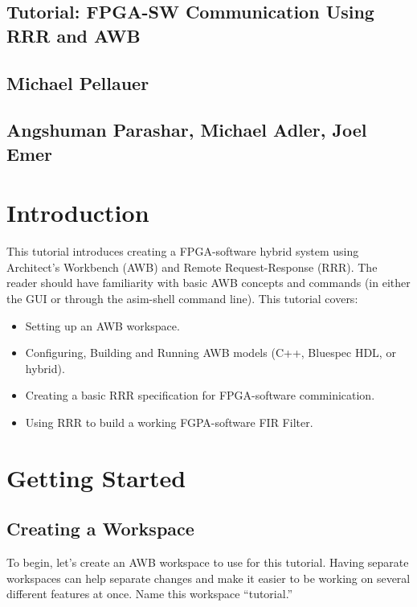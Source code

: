 \documentclass{article}
\begin{document}
\begin{centering}
\section*{Tutorial: FPGA-SW Communication Using RRR and AWB}
\subsection*{Michael Pellauer}
\subsection*{Angshuman Parashar, Michael Adler, Joel Emer}
\end{centering}

\section{Introduction}

This tutorial introduces creating a FPGA-software hybrid system using Architect's Workbench (AWB) and Remote Request-Response (RRR). The reader should have
familiarity with basic AWB concepts and commands (in either the GUI or through the asim-shell command line). This tutorial covers:

\begin{itemize}
    \item Setting up an AWB workspace.
    \item Configuring, Building and Running AWB models (C++, Bluespec HDL, or hybrid).
    \item Creating a basic RRR specification for FPGA-software comminication.
    \item Using RRR to build a working FGPA-software FIR Filter.
\end{itemize}

\section{Getting Started}

\subsection{Creating a Workspace}

To begin, let's create an AWB workspace to use for this tutorial. Having separate workspaces can help separate changes and make it easier to be working on several
different features at once. Name this workspace ``tutorial.''
\end{document}
